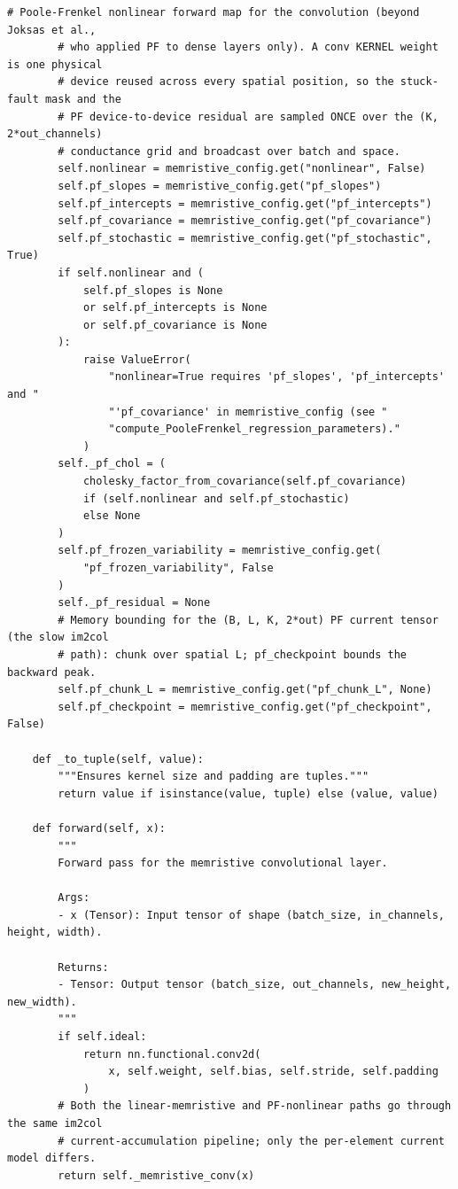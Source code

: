 \begin{lstlisting}[caption={mnn\_torch/layers.py},label={lst:mnn-src-layers}]
        # Poole-Frenkel nonlinear forward map for the convolution (beyond Joksas et al.,
        # who applied PF to dense layers only). A conv KERNEL weight is one physical
        # device reused across every spatial position, so the stuck-fault mask and the
        # PF device-to-device residual are sampled ONCE over the (K, 2*out_channels)
        # conductance grid and broadcast over batch and space.
        self.nonlinear = memristive_config.get("nonlinear", False)
        self.pf_slopes = memristive_config.get("pf_slopes")
        self.pf_intercepts = memristive_config.get("pf_intercepts")
        self.pf_covariance = memristive_config.get("pf_covariance")
        self.pf_stochastic = memristive_config.get("pf_stochastic", True)
        if self.nonlinear and (
            self.pf_slopes is None
            or self.pf_intercepts is None
            or self.pf_covariance is None
        ):
            raise ValueError(
                "nonlinear=True requires 'pf_slopes', 'pf_intercepts' and "
                "'pf_covariance' in memristive_config (see "
                "compute_PooleFrenkel_regression_parameters)."
            )
        self._pf_chol = (
            cholesky_factor_from_covariance(self.pf_covariance)
            if (self.nonlinear and self.pf_stochastic)
            else None
        )
        self.pf_frozen_variability = memristive_config.get(
            "pf_frozen_variability", False
        )
        self._pf_residual = None
        # Memory bounding for the (B, L, K, 2*out) PF current tensor (the slow im2col
        # path): chunk over spatial L; pf_checkpoint bounds the backward peak.
        self.pf_chunk_L = memristive_config.get("pf_chunk_L", None)
        self.pf_checkpoint = memristive_config.get("pf_checkpoint", False)

    def _to_tuple(self, value):
        """Ensures kernel size and padding are tuples."""
        return value if isinstance(value, tuple) else (value, value)

    def forward(self, x):
        """
        Forward pass for the memristive convolutional layer.

        Args:
        - x (Tensor): Input tensor of shape (batch_size, in_channels, height, width).

        Returns:
        - Tensor: Output tensor (batch_size, out_channels, new_height, new_width).
        """
        if self.ideal:
            return nn.functional.conv2d(
                x, self.weight, self.bias, self.stride, self.padding
            )
        # Both the linear-memristive and PF-nonlinear paths go through the same im2col
        # current-accumulation pipeline; only the per-element current model differs.
        return self._memristive_conv(x)


\end{lstlisting}
